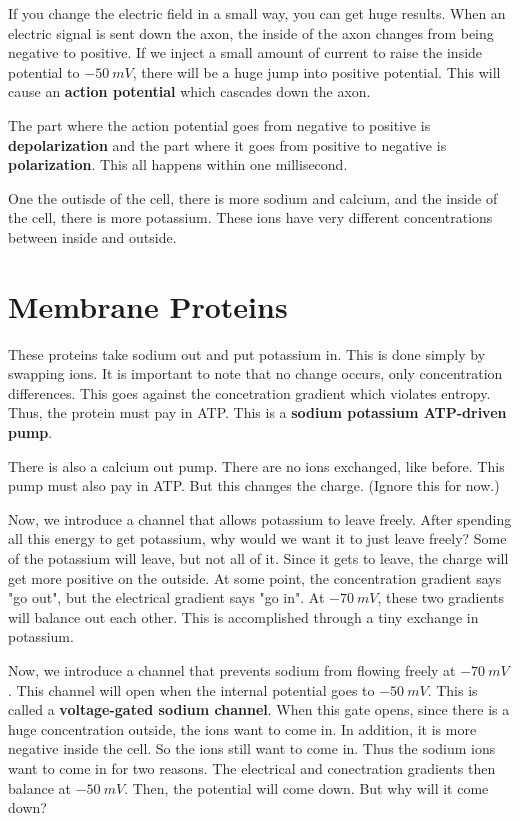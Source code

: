\documentclass{article}
\begin{document}
If you change the electric field in a small way, you can get huge results. When
an electric signal is sent down the axon, the inside of the axon changes from
being negative to positive. If we inject a small amount of current to raise the
inside potential to $-50\ \si{ mV }$, there will be a huge jump into positive
potential. This will cause an \textbf{action potential} which cascades down the
axon. 

The part where the action potential goes from negative to positive is
\textbf{depolarization} and the part where it goes from positive to negative is
\textbf{polarization}. This all happens within one millisecond.

One the outisde of the cell, there is more sodium and calcium, and the inside of
the cell, there is more potassium. These ions have very different concentrations
between inside and outside.

\section{ Membrane Proteins }

These proteins take sodium out and put potassium in. This is done simply by
swapping ions. It is important to note that no change occurs, only concentration
differences. This goes against the concetration gradient which violates entropy.
Thus, the protein must pay in ATP. This is a \textbf{sodium potassium ATP-driven
pump}.

There is also a calcium out pump. There are no ions exchanged, like before. This
pump must also pay in ATP. But this changes the charge. (Ignore this for now.)

Now, we introduce a channel that allows potassium to leave freely. After
spending all this energy to get potassium, why would we want it to just leave
freely? Some of the potassium will leave, but not all of it. Since it gets to
leave, the charge will get more positive on the outside. At some point, the
concentration gradient says "go out", but the electrical gradient says "go in".
At $-70\ \si{ mV }$, these two gradients will balance out each other. This is
accomplished through a tiny exchange in potassium.

Now, we introduce a channel that prevents sodium from flowing freely at $-70\
\si{ mV }$. This channel will open when the internal potential goes to $-50\
\si{ mV }$. This is called a \textbf{voltage-gated sodium channel}. When this
gate opens, since there is a huge concentration outside, the ions want to come
in. In addition, it is more negative inside the cell. So the ions still want to
come in. Thus the sodium ions want to come in for two reasons. The electrical
and conectration gradients then balance at $-50\ \si{ mV }$. Then, the potential
will come down. But why will it come down?
\end{document}

